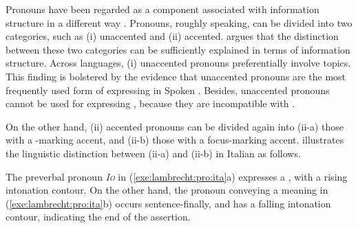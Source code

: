 Pronouns have been regarded as a component associated with information
structure in a different way \citep{lambrecht:96}.  Pronouns, roughly
speaking, can be divided into two categories, such as (i) unaccented
and (ii) accented. \citeauthor{lambrecht:96} argues that the
distinction between these two categories can be sufficiently explained
in terms of information structure.  Across languages, (i) unaccented
pronouns preferentially involve topics.  This finding is bolstered by
the evidence that unaccented pronouns are the most frequently used
form of expressing  in Spoken 
\citep{lambrecht:86}.  Besides, unaccented pronouns cannot be used for
expressing , because they are incompatible with
.


\noindent On the other hand, (ii) accented pronouns can be divided
again into (ii-a) those with a -marking accent, and (ii-b)
those with a focus-marking accent. \citeauthor{lambrecht:96}
illustrates the linguistic distinction between (ii-a) and (ii-b) in
Italian as follows.



\noindent The preverbal pronoun \textit{\textsc{Io}} in
(\ref{exe:lambrecht:pro:ita}a) expresses a , with a rising
intonation contour. On the other hand, the pronoun conveying a
 meaning in (\ref{exe:lambrecht:pro:ita}b) occurs
sentence-finally, and has a falling intonation contour, indicating the
end of the assertion.


